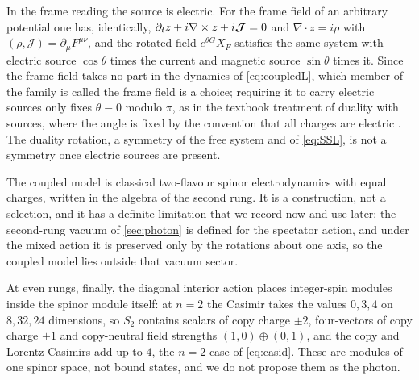 In the frame reading the source is electric. For the frame field of an arbitrary potential one has, identically,
$\partial_tz+i\nabla\times z+i\boldsymbol{\mathcal J}=0$ and $\nabla\cdot z=i\rho$ with $(\rho,\boldsymbol{\mathcal J})=\partial_\mu F^{\mu\nu}$, and the
rotated field $e^{\theta G}X_F$ satisfies the same system with electric source $\cos\theta$ times the current and magnetic source $\sin\theta$
times it. Since the frame field takes no part in the dynamics of \eqref{eq:coupledL}, which member of the family is called the frame
field is a choice; requiring it to carry electric sources only fixes $\theta\equiv0$ modulo $\pi$, as in the textbook treatment of duality
with sources, where the angle is fixed by the convention that all charges are electric \cite{Jackson}. The duality rotation, a symmetry
of the free system and of \eqref{eq:SSL}, is not a symmetry once electric sources are present.

The coupled model is classical two-flavour spinor electrodynamics with equal charges, written in the algebra of the second rung. It
is a construction, not a selection, and it has a definite limitation that we record now and use later: the second-rung vacuum of
\cref{sec:photon} is defined for the spectator action, and under the mixed action it is preserved only by the rotations about one axis,
so the coupled model lies outside that vacuum sector.

At even rungs, finally, the diagonal interior action places integer-spin modules inside the spinor module itself: at $n=2$ the Casimir
takes the values $0,3,4$ on $8,32,24$ dimensions, so $S_2$ contains scalars of copy charge $\pm2$, four-vectors of copy charge $\pm1$ and
copy-neutral field strengths $(1,0)\oplus(0,1)$, and the copy and Lorentz Casimirs add up to $4$, the $n=2$ case of \eqref{eq:casid}. These
are modules of one spinor space, not bound states, and we do not propose them as the photon.
